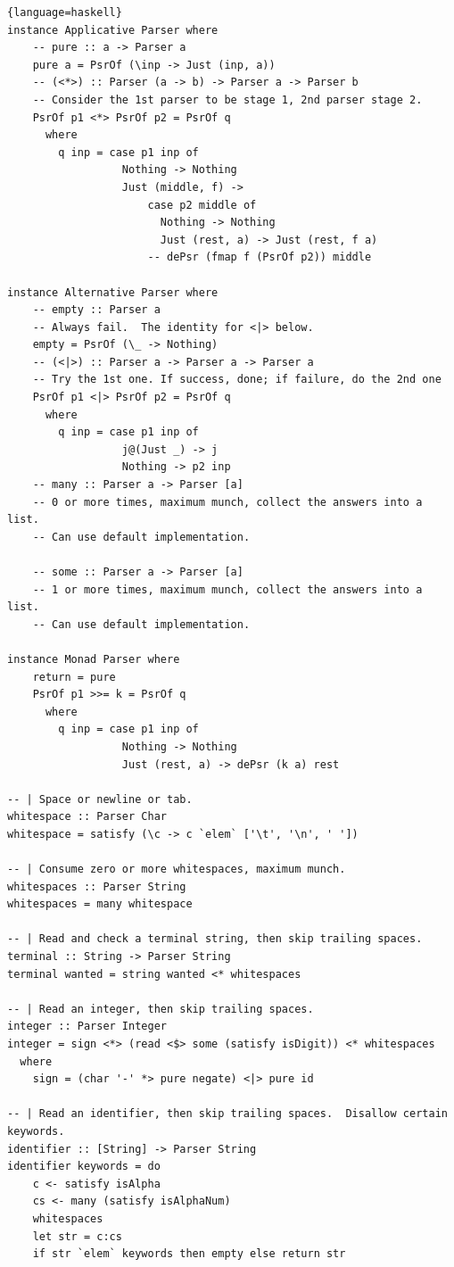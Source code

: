\documentclass[12pt]{article}
\begin{document}
\begin{lstlisting}{language=haskell}
instance Applicative Parser where
    -- pure :: a -> Parser a
    pure a = PsrOf (\inp -> Just (inp, a))
    -- (<*>) :: Parser (a -> b) -> Parser a -> Parser b
    -- Consider the 1st parser to be stage 1, 2nd parser stage 2.
    PsrOf p1 <*> PsrOf p2 = PsrOf q
      where
        q inp = case p1 inp of
                  Nothing -> Nothing
                  Just (middle, f) ->
                      case p2 middle of
                        Nothing -> Nothing
                        Just (rest, a) -> Just (rest, f a)
                      -- dePsr (fmap f (PsrOf p2)) middle

instance Alternative Parser where
    -- empty :: Parser a
    -- Always fail.  The identity for <|> below.
    empty = PsrOf (\_ -> Nothing)
    -- (<|>) :: Parser a -> Parser a -> Parser a
    -- Try the 1st one. If success, done; if failure, do the 2nd one
    PsrOf p1 <|> PsrOf p2 = PsrOf q
      where
        q inp = case p1 inp of
                  j@(Just _) -> j
                  Nothing -> p2 inp
    -- many :: Parser a -> Parser [a]
    -- 0 or more times, maximum munch, collect the answers into a list.
    -- Can use default implementation.

    -- some :: Parser a -> Parser [a]
    -- 1 or more times, maximum munch, collect the answers into a list.
    -- Can use default implementation.

instance Monad Parser where
    return = pure
    PsrOf p1 >>= k = PsrOf q
      where
        q inp = case p1 inp of
                  Nothing -> Nothing
                  Just (rest, a) -> dePsr (k a) rest

-- | Space or newline or tab.
whitespace :: Parser Char
whitespace = satisfy (\c -> c `elem` ['\t', '\n', ' '])

-- | Consume zero or more whitespaces, maximum munch.
whitespaces :: Parser String
whitespaces = many whitespace

-- | Read and check a terminal string, then skip trailing spaces.
terminal :: String -> Parser String
terminal wanted = string wanted <* whitespaces

-- | Read an integer, then skip trailing spaces.
integer :: Parser Integer
integer = sign <*> (read <$> some (satisfy isDigit)) <* whitespaces
  where
    sign = (char '-' *> pure negate) <|> pure id

-- | Read an identifier, then skip trailing spaces.  Disallow certain keywords.
identifier :: [String] -> Parser String
identifier keywords = do
    c <- satisfy isAlpha
    cs <- many (satisfy isAlphaNum)
    whitespaces
    let str = c:cs
    if str `elem` keywords then empty else return str


\end{lstlisting}
\end{document}
